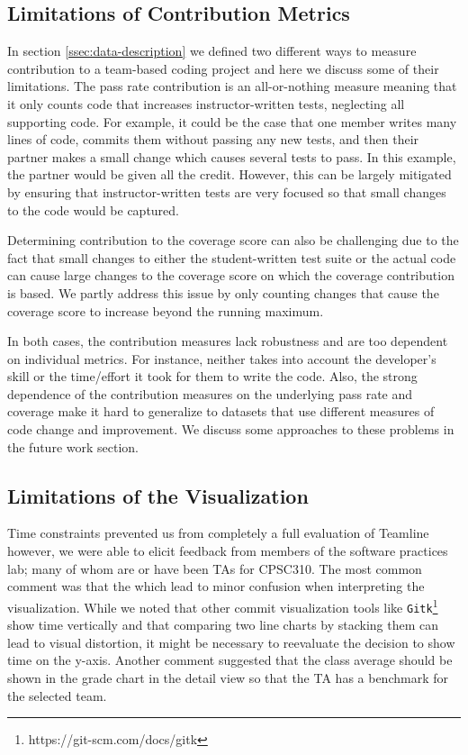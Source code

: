 \documentclass[../manifest.tex]{subfiles}
\begin{document}
\subsection{Limitations of Contribution Metrics}
In section \ref{ssec:data-description} we defined two different ways to measure contribution to a team-based coding project and here we discuss some of their limitations.
The pass rate contribution is an all-or-nothing measure meaning that it only counts code that increases instructor-written tests, neglecting all supporting code. For example, it could be the case that one member writes many lines of code, commits them without passing any new tests, and then their partner makes a small change which causes several tests to pass. In this example, the partner would be given all the credit. However, this can be largely mitigated by ensuring that instructor-written tests are very focused so that small changes to the code would be captured.

Determining contribution to the coverage score can also be challenging due to the fact that small changes to either the student-written test suite or the actual code can cause large changes to the coverage score on which the coverage contribution is based. We partly address this issue by only counting changes that cause the coverage score to increase beyond the running maximum.

In both cases, the contribution measures lack robustness and are too dependent on individual metrics. For instance, neither takes into account the developer's skill or the time/effort it took for them to write the code. Also, the strong dependence of the contribution measures on the underlying pass rate and coverage make it hard to generalize to datasets that use different measures of code change and improvement. We discuss some approaches to these problems in the future work section.



\subsection{Limitations of the Visualization}
Time constraints prevented us from completely a full evaluation of Teamline however, we were able to elicit feedback from members of the software practices lab; many of whom are or have been TAs for CPSC310. The most common comment was that the  which lead to minor confusion when interpreting the visualization. While we noted that other commit visualization tools like \texttt{Gitk}\footnote{https://git-scm.com/docs/gitk} show time vertically and that comparing two line charts by stacking them can lead to visual distortion, it might be necessary to reevaluate the decision to show time on the y-axis. Another comment suggested that the class average should be shown in the grade chart in the detail view so that the TA has a benchmark for the selected team.
\end{document}
